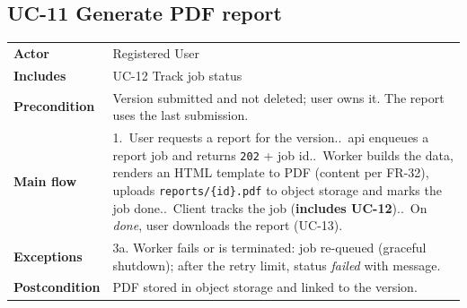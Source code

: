 \documentclass[11pt,a4paper]{article}
\begin{document}
\noindent\begin{minipage}{\linewidth}
\subsection*{UC-11 Generate PDF report}
\begin{tabularx}{\linewidth}{@{}>{\raggedright\leavevmode\bfseries\color{creBlue}}p{2.6cm} Y@{}}
\toprule
Actor & Registered User \\
Includes & UC-12 Track job status \\
Precondition & Version submitted and not deleted; user owns it. The report uses the last submission. \\
Main flow & 1.~User requests a report for the version..~api enqueues a report job and returns \texttt{202} + job id..~Worker builds the data, renders an HTML template to PDF (content per FR-32), uploads \texttt{reports/\{id\}.pdf} to object storage and marks the job done..~Client tracks the job (\textbf{includes UC-12})..~On \emph{done}, user downloads the report (UC-13). \\
Exceptions & 3a. Worker fails or is terminated: job re-queued (graceful shutdown); after the retry limit, status \emph{failed} with message. \\
Postcondition & PDF stored in object storage and linked to the version. \\
\bottomrule
\end{tabularx}
\end{minipage}
\par\medskip
\end{document}
